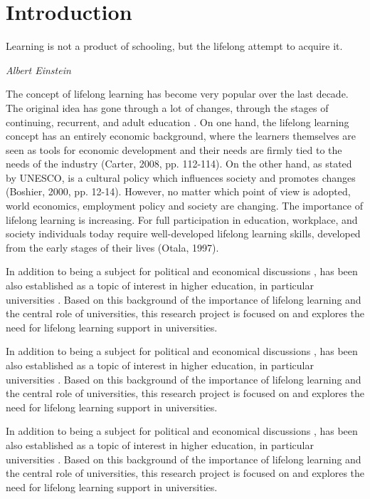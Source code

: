 \chapter{Introduction\label{cha:intro}}
\epigraph{Learning is not a product of schooling, but the lifelong attempt to
acquire it.}{\textit{Albert Einstein}}
\noindent
The concept of lifelong learning has become very popular over the last decade.
The original idea has gone through a lot of changes, through the stages of
continuing, recurrent, and adult education \citep{Jarvis2004}. On one hand, the
lifelong learning concept has an entirely economic background, where the
learners themselves are seen as tools for economic development and their needs
are firmly tied to the needs of the industry (Carter, 2008, pp. 112-114). On the
other hand, as stated by UNESCO, \LLLs is a cultural policy which influences
society and promotes changes (Boshier, 2000, pp. 12-14). However, no matter
which point of view is adopted, world economics, employment policy and society
are changing. The importance of lifelong learning is increasing. For full
participation in education, workplace, and society individuals today require
well-developed lifelong learning skills, developed from the early stages of
their lives (Otala, 1997).

In addition to being a subject for political and economical discussions
\citep{Bagnall2009}, \LLLs has been also established as a topic of interest in
higher education, in particular universities \citep{Knapper2000}. Based on this
background of the importance of lifelong learning and the central role of
universities, this research project is focused on and explores the need for
lifelong learning support in universities.

In addition to being a subject for political and economical discussions
\citep{Bagnall2009}, \LLLs has been also established as a topic of interest in
higher education, in particular universities \citep{Knapper2000}. Based on this
background of the importance of lifelong learning and the central role of
universities, this research project is focused on and explores the need for
lifelong learning support in universities.

In addition to being a subject for political and economical discussions
\citep{Bagnall2009}, \LLLs has been also established as a topic of interest in
higher education, in particular universities \citep{Knapper2000}. Based on this
background of the importance of lifelong learning and the central role of
universities, this research project is focused on and explores the need for
lifelong learning support in universities.

